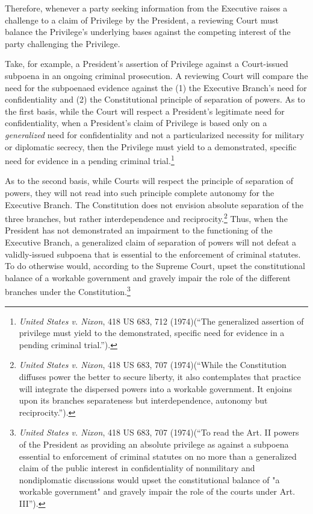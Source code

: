 Therefore, whenever a party seeking information from the Executive raises a challenge to a claim of Privilege by the President, a reviewing Court must balance the Privilege's underlying bases against the competing interest of the party challenging the Privilege.

Take, for example, a President's assertion of Privilege against a Court-issued subpoena in an ongoing criminal prosecution.  A reviewing Court will compare the need for the subpoenaed evidence against the (1) the Executive Branch's need for confidentiality and (2) the Constitutional principle of separation of powers.  As to the first basis, while the Court will respect a President's legitimate need for confidentiality, when a President's claim of Privilege is based only on a \textit{generalized} need for confidentiality and not a particularized necessity for military or diplomatic secrecy, then the Privilege must yield to a demonstrated, specific need for evidence in a pending criminal trial.\footnote{\textit{United States v. Nixon}, 418 US 683, 712 (1974)(``The generalized assertion of privilege must yield to the demonstrated, specific need for evidence in a pending criminal trial.'').}  

As to the second basis, while Courts will respect the principle of separation of powers, they will not read into such principle complete autonomy for the Executive Branch.  The Constitution does not envision absolute separation of the three branches, but rather interdependence and reciprocity.\footnote{\textit{United States v. Nixon}, 418 US 683, 707 (1974)(``While the Constitution diffuses power the better to secure liberty, it also contemplates that practice will integrate the dispersed powers into a workable government. It enjoins upon its branches separateness but interdependence, autonomy but reciprocity.'').}  Thus, when the President has not demonstrated an impairment to the functioning of the Executive Branch, a generalized claim of separation of powers will not defeat a validly-issued subpoena that is essential to the enforcement of criminal statutes.  To do otherwise would, according to the Supreme Court, upset the constitutional balance of a workable government and gravely impair the role of the different branches under the Constitution.\footnote{\textit{United States v. Nixon}, 418 US 683, 707 (1974)(``To read the Art. II powers of the President as providing an absolute privilege as against a subpoena essential to enforcement of criminal statutes on no more than a generalized claim of the public interest in confidentiality of nonmilitary and nondiplomatic discussions would upset the constitutional balance of "a workable government" and gravely impair the role of the courts under Art. III'').}


